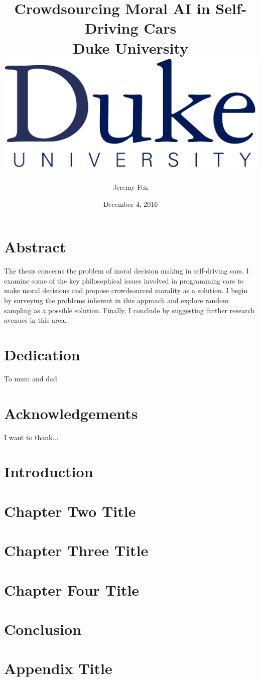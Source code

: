 \documentclass[12pt]{report}
\title{
	{Crowdsourcing Moral AI in Self-Driving Cars}\\
	{\large Duke University}\\
	{\includegraphics[width=\textwidth]{duke.png}}
}
\author{Jeremy Fox}
\date{December 4, 2016}
\begin{document}
\maketitle




\chapter*{Abstract}
The thesis concerns the problem of moral decision making in self-driving cars. I examine some of the key philosophical issues involved in programming cars to make moral decisions and propose crowdsourced morality as a solution. I begin by surveying the problems inherent in this approach and explore random sampling as a possible solution. Finally, I conclude by suggesting further research avenues in this area.

\chapter*{Dedication}
To mum and dad

\chapter*{Acknowledgements}
I want to thank...

\tableofcontents

\chapter{Introduction}


\chapter{Chapter Two Title}


\chapter{Chapter Three Title}


\chapter{Chapter Four Title}


\chapter{Conclusion}


\appendix
\chapter{Appendix Title}

\end{document}
